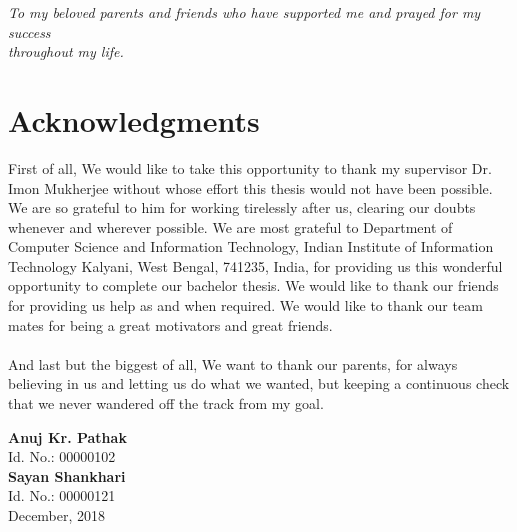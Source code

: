 \documentclass[a4paper,12pt]{report}
\newenvironment{dedication}
  {\clearpage		%
   \thispagestyle{empty}%
   \vspace*{\stretch{1}}%
   \itshape		%
   \centering		%
  }
  {\par			%
   \vspace{\stretch{3}} %
   \clearpage		%
  }
\begin{document}

\newpage
\begin{dedication}
\textit{To my beloved parents and friends who have supported me and prayed for
my success\\ throughout my life.}
\end{dedication}

\chapter*{Acknowledgments}
First of all, We would like to take this opportunity to thank my supervisor Dr. Imon Mukherjee without whose effort this thesis would not have been possible. We are so grateful to him for working tirelessly after us, clearing our doubts whenever and wherever possible. We are most grateful to Department of Computer Science and Information Technology, Indian Institute of Information Technology Kalyani, West Bengal, 741235, India, for providing us this wonderful opportunity to complete our bachelor thesis. We would like to thank our friends for providing us help as and when required. We would like to thank our team mates for being a great motivators and great friends.\\
\\
\linebreak And last but the biggest of all, We want to thank our parents, for always believing in us and letting us do what we wanted, but keeping a continuous check that we never wandered off the track from my goal.\\

\bigskip
\bigskip
\bigskip
\bigskip
\begin{flushleft}
\bigskip
\textbf{Anuj Kr. Pathak}\\
\smallskip
Id. No.: 00000102\\
\bigskip
\bigskip
\bigskip
\textbf{Sayan Shankhari}\\
\smallskip
Id. No.: 00000121\\
\bigskip
December, 2018\\
\end{flushleft}


\newpage
\end{document}
